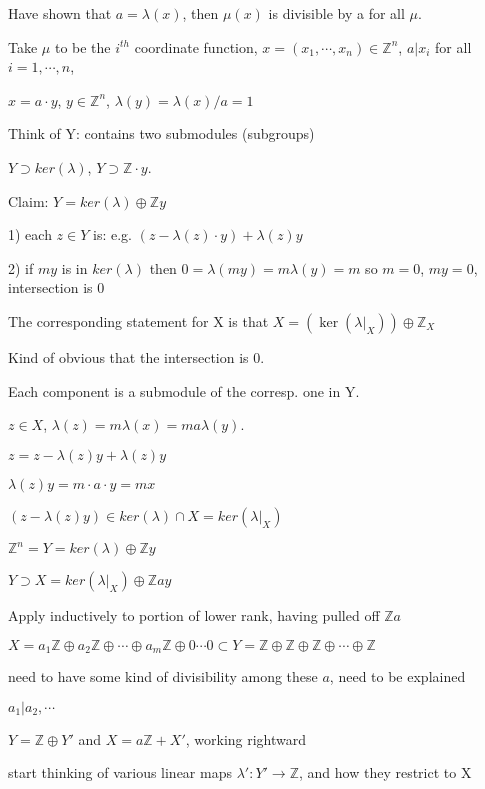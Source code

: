 \documentclass[12pt]{article}
\begin{document}
Have shown that $a = \lambda(x)$, then $\mu(x)$ is divisible by a for all $\mu$.

Take $\mu$ to be the $i^{th}$ coordinate function, $x = (x_1, \cdots, x_n) \in \mathds{Z}^n$, $a|x_i$ for all $i = 1, \cdots, n$, 

$x = a \cdot y$, $y \in \mathds{Z}^n$, $\lambda(y) = \lambda(x)/a = 1$

\noindent
Think of Y: contains two submodules (subgroups)

$Y \supset ker(\lambda)$, $Y \supset \mathds{Z} \cdot y$.

Claim: $Y = ker(\lambda) \oplus \mathds{Z}y$

1) each $z \in Y$ is: e.g. $(z - \lambda(z) \cdot y) + \lambda(z)y$

2) if $my$ is in $ker(\lambda)$ then $0 = \lambda(my) = m\lambda(y) = m$ so $m = 0$, $my = 0$, intersection is 0

\noindent
The corresponding statement for X is that $X = (\ker(\lambda|_X)) \oplus \mathds{Z}_X$

Kind of obvious that the intersection is 0.

Each component is a submodule of the corresp. one in Y.

$z \in X$, $\lambda(z) = m\lambda(x) = ma\lambda(y)$.

$z = z - \lambda(z)y + \lambda(z)y$

$\lambda(z)y = m\cdot a\cdot y = mx$

$(z - \lambda(z)y) \in ker(\lambda) \cap X = ker(\lambda|_X)$

\noindent
$\mathds{Z}^n = Y = ker(\lambda) \oplus \mathds{Z}y$

$Y \supset X = ker(\lambda|_X) \oplus \mathds{Z}ay$

Apply inductively to portion of lower rank, having pulled off $\mathds{Z}a$

\noindent
$X = a_1\mathds{Z} \oplus a_2\mathds{Z} \oplus \cdots \oplus a_m\mathds{Z} \oplus 0 \cdots 0 \subset Y = \mathds{Z} \oplus \mathds{Z} \oplus \mathds{Z} \oplus \cdots \oplus \mathds{Z}$

need to have some kind of divisibility among these $a$, need to be explained

$a_1|a_2, \cdots$

\noindent
$Y = \mathds{Z} \oplus Y'$ and $X = a\mathds{Z} + X'$, working rightward

start thinking of various linear maps $\lambda': Y' \to \mathds{Z}$, and how they restrict to X
\end{document}
